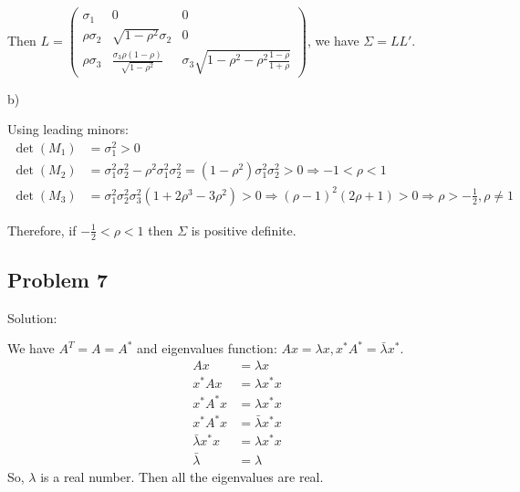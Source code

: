 \documentclass[letterpaper, 11pt]{article}
\newcommand{\1}{\mathds{1}}	%
\theoremstyle{definition}
\begin{document}
Then $L = \begin{pmatrix}
    \sigma_1     & 0                                               & 0                                                          \\
    \rho\sigma_2 & \sqrt{1-\rho ^{2}}\sigma_2                      & 0                                                          \\
    \rho\sigma_3 & \frac{\sigma_3\rho(1-\rho)}{\sqrt{1-\rho ^{2}}} & \sigma_3 \sqrt{1-\rho ^{2}-\rho ^{2}\frac{1-\rho}{1+\rho}}
  \end{pmatrix}$, we have $\Sigma = LL'$.

b)

Using leading minors:
\begin{align*}
  \det (M_1) & = \sigma_{1}^{2} > 0                                                                                                                                         \\
  \det(M_2)  & = \sigma_{1}^{2}\sigma_{2}^{2}-\rho ^{2}\sigma_{1}^{2}\sigma_{2}^{2} = (1-\rho ^{2})\sigma_1 ^{2}\sigma_2 ^{2} > 0  \Rightarrow  -1 < \rho < 1               \\
  \det (M_3) & = \sigma_{1}^{2}\sigma_{2}^{2}\sigma_{3}^{2}(1+2\rho ^{3}-3\rho ^{2}) > 0 \Rightarrow (\rho-1)^{2}(2\rho+1) > 0 \Rightarrow \rho > -\frac{1}{2}, \rho \neq 1
\end{align*}

Therefore, if $-\frac{1}{2}< \rho < 1$ then $\Sigma$ is positive definite.


\subsection*{Problem 7}

Solution:

We have $A ^{T} = A = A ^{*}$ and eigenvalues function: $Ax=\lambda x , x ^{*} A ^{*}= \bar{\lambda} x ^{*}$.
\begin{align*}
  Ax                   & = \lambda x            \\
  x ^{*}Ax             & = \lambda x ^{*}x      \\
  x ^{*}A ^{*} x       & = \lambda x ^{*}x      \\
  x ^{*}A ^{*} x       & = \bar{\lambda}x ^{*}x \\
  \bar{\lambda}x ^{*}x & = \lambda x ^{*}x      \\
  \bar{\lambda}        & = \lambda
\end{align*}
So, $\lambda$ is a real number. Then all the eigenvalues are real.




\end{document}
